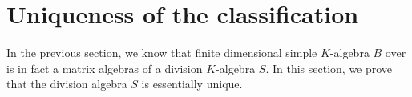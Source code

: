 \section{Uniqueness of the classification}
In the previous section, we know that finite dimensional simple $K$-algebra $B$ over is in fact a matrix algebras of a division $K$-algebra $S$. In this section, we prove that the division algebra $S$ is essentially unique.

